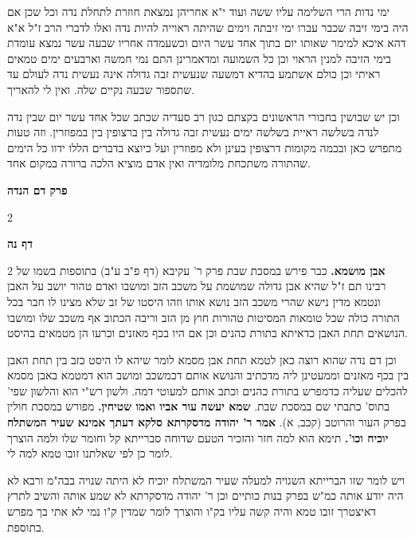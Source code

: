 \documentclass[12pt, openany]{book}
\newcommand{\sethebfont}{
\fontsize{10.5pt}{21.0pt} \selectfont
}
\newcommand{\twocol}[1]{
	{\sethebfont \begin{multicols}{2}
			#1
	\end{multicols}}	
}
\newcommand{\chapname}{}
\newcommand{\sectname}{}
\newcommand{\newchap}[1]{
	\addcontentsline{toc}{chapter}{#1}
	\renewcommand{\chapname}{#1}
		\begin{center}
			\textbf{%
\fontsize{16pt}{16pt}\selectfont
				#1}
		\end{center}
}
\newcommand{\newsection}[1]{
	\renewcommand{\sectname}{#1}	
	\vspace{-\baselineskip}
	\begin{center}
		\textbf{%
\fontsize{16pt}{16pt}\selectfont
			#1}
	\end{center}
	\vspace{-\baselineskip}
	\nopagebreak
}
\begin{document}
{{ימי נדות הרי השלימה עליו ששה ועוד י"א אחריהן נמצאת חוזרת לתחלת נדה וכל שכן אם היה בימי זיבה שכבר עברו ימי זיבתה וימים שהיתה ראוייה להיות נדה ואלו לדברי הרב ז"ל א"א דהא איכא למימר שאותו יום בתוך אחד עשר היום וכשעמדה אחריו שבעה עשר נמצא עומדת בימי הזיבה למנין הראוי וכן כל השמועה ומדאמרינן התם נמי חמשה וארבעים ימים טמאים ראיתי וכן כולם אשתמע בהדיא דמשעה שנעשית זבה גדולה אינה נעשית נדה לעולם עד שתספור שבעה נקיים שלה. ואין לי להאריך.\par וכן יש שבושין בחבורי הראשונים בקצתם כגון רב סעדיה שכתב שכל אחד עשר יום שבין נדה לנדה בשלשה ראיית בשלשה ימים נעשית זבה גדולה בין ברצופין בין במפוזרין. וזה טעות מתפרש כאן ובכמה מקומות דרצופין בעינן ולא מפוזרין ועל כיוצא בדברים הללו ידוו כל הימים שהתורה משתכחת מלומדיה ואין אדם מוציא הלכה ברורה במקום אחד. }

\newchap{פרק  דם הנדה}
\twocol{\clearpage}

\newsection{דף נה}
\twocol{\textbf{אבן מושמא.} כבר פירש במסכת שבת פרק ר' עקיבא (דף פ"ב ע"ב) בתוספות בשמו של רבינו תם ז"ל שהיא אבן גדולה שמושמת על משכב הזב ומושבו ואדם טהור יושב על האבן ונטמא מדין נישא שהרי משכב הזב נושא אותו וזהו היסטו של זב שלא מצינו לו חבר בכל התורה כולה שכל טומאות המסיטות טהורות חוץ מן הזב וריבה הכתוב אף משכב שלו ומושבו הנושאים תחת האבן כדאיתא בתורת כהנים וכן אם היו בכף מאזנים וכרעו הן מטמאים בהיסט.\par וכן דם נדה שהוא רוצה כאן לטמא תחת אבן מסמא לומר שיהא לו היסט כזב בין תחת האבן בין בכף מאזנים וממעטינן ליה מדכתיב והנושא אותם דכמשכב ומושב הוא דמטמא באבן מסמא להכלים שעליה כדמפרש בתורת כהנים וכתב אותם למעוטי דמה. ולשון רש"י הוא והלשון שפי' בתוס' כתבתי שם במסכת שבת. 
\textbf{שמא יעשה עור אביו ואמו שטיחין.} מפורש במסכת חולין בפרק העור והרוטב (קכב, א). 
\textbf{אמר ר' יהודה מדסקרתא סלקא דעתך אמינא שעיר המשתלח יוכיח וכו'.} תימא הוא למה חזר והזכיר הטעם שדוחה סברייתא קל וחומר שלו ולמה הוצרך לומר כן לפי שאלתנו זובו טמא למה לי.\par ויש לומר שזו הברייתא השגויה למעלה שעיר המשתלח יוכיח לא היתה שנויה בבה"מ ורבא לא היה יודע אותה כמ"ש בפרק בנות כותיים וכן ר' יהודה מדסקרתא לא שמע אותה והשיב לתרץ דאיצטרך זובו טמא והיה קשה עליו בק"ו והוצרך לומר שמדין ק"ו נמי לא אתי בך מפרש בתוספת. 
\clearpage}

}
\end{document}
